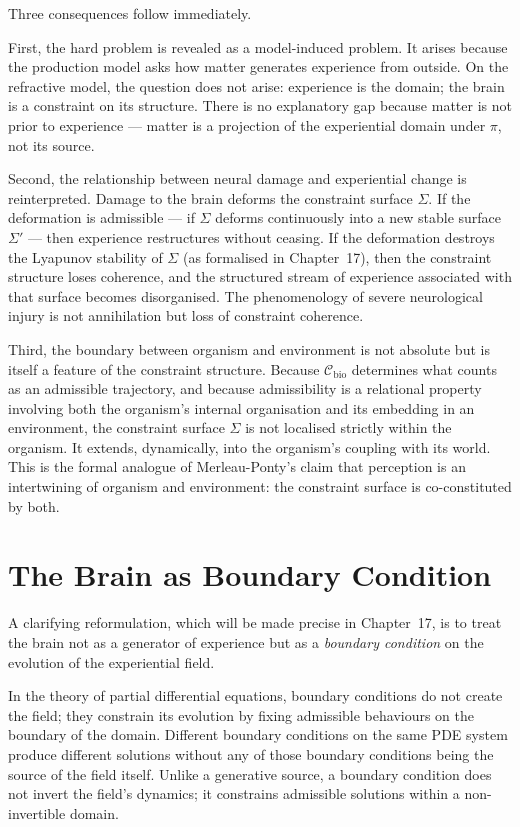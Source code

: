 \documentclass[11pt,openany]{book}
\begin{document}
Three consequences follow immediately.

First, the hard problem is revealed as a model-induced
problem.  It arises because the production model asks how
matter generates experience from outside.  On the refractive
model, the question does not arise: experience is the
domain; the brain is a constraint on its structure.  There
is no explanatory gap because matter is not prior to
experience --- matter is a projection of the experiential
domain under $\pi$, not its source.

Second, the relationship between neural damage and
experiential change is reinterpreted.  Damage to the brain
deforms the constraint surface $\Sigma$.  If the
deformation is admissible --- if $\Sigma$ deforms
continuously into a new stable surface $\Sigma'$ ---
then experience restructures without ceasing.  If the
deformation destroys the Lyapunov stability of $\Sigma$
(as formalised in Chapter~17), then the constraint structure
loses coherence, and the structured stream of experience
associated with that surface becomes disorganised.  The
phenomenology of severe neurological injury is not
annihilation but loss of constraint coherence.

Third, the boundary between organism and environment is not
absolute but is itself a feature of the constraint
structure.  Because $\mathcal{C}_{\mathrm{bio}}$ determines
what counts as an admissible trajectory, and because
admissibility is a relational property involving both the
organism's internal organisation and its embedding in an
environment, the constraint surface $\Sigma$ is not
localised strictly within the organism.  It extends,
dynamically, into the organism's coupling with its world.
This is the formal analogue of Merleau-Ponty's claim that
perception is an intertwining of organism and environment:
the constraint surface is co-constituted by both.

\section{The Brain as Boundary Condition}
\label{sec:boundary-condition}

A clarifying reformulation, which will be made precise in
Chapter~17, is to treat the brain not as a generator of
experience but as a \emph{boundary condition} on the
evolution of the experiential field.

In the theory of partial differential equations, boundary
conditions do not create the field; they constrain its
evolution by fixing admissible behaviours on the boundary
of the domain.  Different boundary conditions on the same
PDE system produce different solutions without any of those
boundary conditions being the source of the field itself.
Unlike a generative source, a boundary condition does not
invert the field's dynamics; it constrains admissible
solutions within a non-invertible domain.
\end{document}
